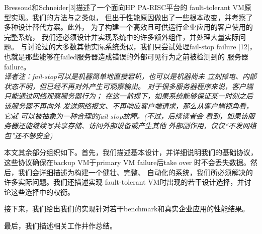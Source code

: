 Bressoud和Schneider[3]描述了一个面向HP PA-RISC平台的%
fault-tolerant VM原型实现。我们的方法与之类似，%
但出于性能原因做出了一些根本改变，并考察了多种设计替代方案。此外，%
为了构建一个高效且可供运行企业应用的客户使用的完整系统，%
我们还必须设计并实现系统中的许多额外组件，并处理大量实际问题。%
与讨论过的大多数其他实际系统类似，我们只尝试处理fail-stop failure%
[12]，也就是那些能够在failed服务器造成错误的外部可见行为之前被检测到的%
服务器failure。%
\\\emph{译者注：fail-stop可以是机器简单地直接宕机，也可以是机器尚未%
立刻掉电、内部状态不明，但已经不再对外产生可观察输出。%
对于很多服务器程序来说，客户端只能通过网络观察服务器行为；%
在这一前提下，如果系统能够保证某一时刻之后该服务器不再向外%
发送网络报文、不再响应客户端请求，那么从客户端视角看，它就%
可以被抽象为一种合理的fail-stop故障。(不过，后续读者会%
看到，如果该服务器还能继续写共享存储、访问外部设备或产生其他
外部副作用，仅仅“不发网络包”还不够安全)}

本文其余部分组织如下。首先，我们描述基本设计，并详细说明我们的基础协议，%
这些协议确保在backup VM于primary VM failure后take over%
时不会丢失数据。然后，我们会详细描述为构建一个健壮、完整、%
自动化的系统，我们所必须解决的许多实际问题。我们还描述实现%
fault-tolerant VM时出现的若干设计选择，并讨论这些选择中的权衡。%

接下来，我们给出我们的实现针对若干benchmark和真实企业应用的性能结果。%

最后，我们描述相关工作并作总结。

